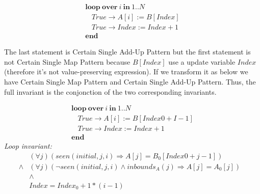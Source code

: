 \documentclass[a4paper,10pt]{article}
\newcommand{\idx}{\ensuremath{i}\xspace}
\newcommand{\idxinitial}{\ensuremath{\mathit{initial}}\xspace}
\newcommand{\KWloop}{\ensuremath{\mathrm{\textbf{loop}}~}}
\newcommand{\KWend}{\ensuremath{\mathrm{\textbf{end}}~}}
\newcommand{\KWover}{\ensuremath{\mathrm{\textbf{over}}~}}
\newcommand{\KWin}{\ensuremath{~\mathrm{\textbf{in}}~}}
\newcommand{\impl}{\ensuremath{\Longrightarrow}}
\newcommand{\inbounds}[2]{\ensuremath{\mathit{inbounds}_{#1}(#2)}\xspace}
\newcommand{\seen}[3]{\ensuremath{\mathit{seen}{(#1,#2,#3)}}\xspace}
\newcommand{\loopinvariant}{\noindent\textit{Loop invariant:}\xspace}
\begin{document}
$$\begin{array}{l}
  \KWloop \KWover i \KWin 1 .. N \\
  ~~~~ True \rightarrow A[i] := B[Index]\\
  ~~~~ True \rightarrow Index := Index + 1\\
  \KWend
\end{array}$$

The last statement is Certain Single Add-Up Pattern but the first statement is not Certain Single Map Pattern
because $B[Index]$ use a update variable $Index$ (therefore it's not value-preserving expression). 
If we transform it as below we have Certain Single Map Pattern and Certain Single Add-Up Pattern. 
Thus, the full invariant is the conjonction of the two corresponding invariants.

$$\begin{array}{l}
  \KWloop \KWover i \KWin 1 .. N \\
  ~~~~ True \rightarrow A[i]   := B[Index0 + I-1]\\
  ~~~~ True \rightarrow Index := Index + 1\\
  \KWend
\end{array}$$
%
\loopinvariant
%
\begin{eqnarray*}
&(\forall j)(\seen{\idxinitial}{j}{\idx} \impl A[j] = B_0[Index0 + j-1]) \\
\land& (\forall j)(\neg \seen{\idxinitial}{j}{\idx} \land \inbounds{A}{j} \impl A[j] = A_0[j])\\
&\land& \\
&Index = Index_0 + 1 * (i-1)&
\end{eqnarray*}



\end{document}
